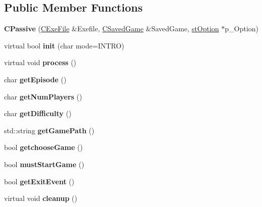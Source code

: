\subsection*{Public Member Functions}
\begin{DoxyCompactItemize}
\item 
\hypertarget{class_c_passive_a14363f4ee27414935e97fd5c0162a243}{
{\bfseries CPassive} (\hyperlink{class_c_exe_file}{CExeFile} \&Exefile, \hyperlink{class_c_saved_game}{CSavedGame} \&SavedGame, \hyperlink{structst_option}{stOption} $\ast$p\_\-Option)}
\label{class_c_passive_a14363f4ee27414935e97fd5c0162a243}

\item 
\hypertarget{class_c_passive_a30b197ea62cda3901637b2fa6ae7fabd}{
virtual bool {\bfseries init} (char mode=INTRO)}
\label{class_c_passive_a30b197ea62cda3901637b2fa6ae7fabd}

\item 
\hypertarget{class_c_passive_aa4a01bfda44f0e94befe1c5625f12571}{
virtual void {\bfseries process} ()}
\label{class_c_passive_aa4a01bfda44f0e94befe1c5625f12571}

\item 
\hypertarget{class_c_passive_a9358ec29a162cda49dc544f9c7435372}{
char {\bfseries getEpisode} ()}
\label{class_c_passive_a9358ec29a162cda49dc544f9c7435372}

\item 
\hypertarget{class_c_passive_a01956d8ff661e301f1e4391dbe364f63}{
char {\bfseries getNumPlayers} ()}
\label{class_c_passive_a01956d8ff661e301f1e4391dbe364f63}

\item 
\hypertarget{class_c_passive_a0ddc3bfddebcc50cbd52e3a63c3e4748}{
char {\bfseries getDifficulty} ()}
\label{class_c_passive_a0ddc3bfddebcc50cbd52e3a63c3e4748}

\item 
\hypertarget{class_c_passive_a792100dd36413f63357ba6fca7175837}{
std::string {\bfseries getGamePath} ()}
\label{class_c_passive_a792100dd36413f63357ba6fca7175837}

\item 
\hypertarget{class_c_passive_a39be6728d76e111fafe154d2c7201a53}{
bool {\bfseries getchooseGame} ()}
\label{class_c_passive_a39be6728d76e111fafe154d2c7201a53}

\item 
\hypertarget{class_c_passive_af13392a5105573b07d5ec46bf595de85}{
bool {\bfseries mustStartGame} ()}
\label{class_c_passive_af13392a5105573b07d5ec46bf595de85}

\item 
\hypertarget{class_c_passive_a1d66d676e22441365c957b9013661c2c}{
bool {\bfseries getExitEvent} ()}
\label{class_c_passive_a1d66d676e22441365c957b9013661c2c}

\item 
\hypertarget{class_c_passive_a8d564bd1afbdee39e542efc4ae831e6a}{
virtual void {\bfseries cleanup} ()}
\label{class_c_passive_a8d564bd1afbdee39e542efc4ae831e6a}

\end{DoxyCompactItemize}
